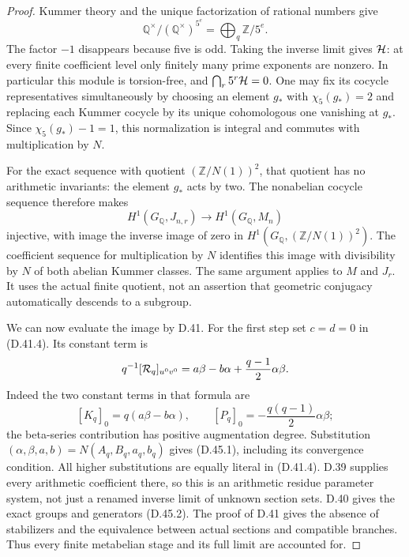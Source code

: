 \begin{proof}
Kummer theory and the unique factorization of rational
numbers give
\[
 \mathbb Q^\times/(\mathbb Q^\times)^{5^e}
       =\bigoplus_q\mathbb Z/5^e.
\]
The factor \(-1\) disappears because five is odd.
Taking the inverse limit gives \({\cal H}\):
at every finite coefficient level only finitely many
prime exponents are nonzero. In particular this
module is torsion-free, and
\(\bigcap_r5^r{\cal H}=0\).
One may fix its cocycle representatives simultaneously
by choosing an element \(g_*\) with \(\chi_5(g_*)=2\)
and replacing each Kummer cocycle by its unique
cohomologous one vanishing at \(g_*\). Since
\(\chi_5(g_*)-1=1\), this normalization is integral
and commutes with multiplication by \(N\).

For the exact sequence with quotient
\((\mathbb Z/N(1))^2\), that quotient has no arithmetic
invariants: the element \(g_*\) acts by two.
The nonabelian cocycle sequence therefore makes
\[
 H^1(G_{\mathbb Q},J_{n,r})
     \longrightarrow H^1(G_{\mathbb Q},M_n)
\]
injective, with image the inverse image of zero
in \(H^1(G_{\mathbb Q},(\mathbb Z/N(1))^2)\).
The coefficient sequence for multiplication by \(N\)
identifies this image with divisibility by \(N\)
of both abelian Kummer classes. The same argument
applies to \(M\) and \(J_r\). It uses the actual
finite quotient, not an assertion that geometric
conjugacy automatically descends to a subgroup.

We can now evaluate the image by D.41. For the
first step set \(c=d=0\) in (D.41.4). Its constant
term is
\[
 q^{-1}[{\cal R}_q]_{u^0v^0}
   =a\beta-b\alpha+\frac{q-1}{2}\alpha\beta.
\]
Indeed the two constant terms in that formula are
\[
 [K_q]_0=q(a\beta-b\alpha),\qquad
 [P_q]_0=-\frac{q(q-1)}2\alpha\beta;
\]
the beta-series contribution has positive
augmentation degree. Substitution
\((\alpha,\beta,a,b)=N(A_q,B_q,a_q,b_q)\)
gives (D.45.1), including its convergence condition.
All higher substitutions are equally literal in
(D.41.4). D.39 supplies every arithmetic coefficient
there, so this is an arithmetic residue parameter
system, not just a renamed inverse limit of unknown
section sets. D.40 gives the exact groups and
generators (D.45.2). The proof of D.41 gives the
absence of stabilizers and the equivalence between
actual sections and compatible branches.
Thus every finite metabelian stage and its full
limit are accounted for.


\end{proof}
